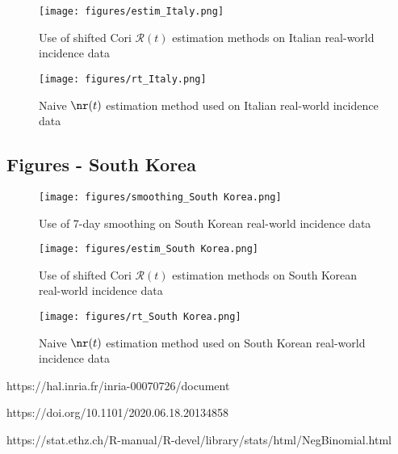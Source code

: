 \documentclass{article}
\newcommand{\nR}{\mathscr{R}}
\begin{document}
\begin{figure}[h!]
    \centering
    \texttt{[image: figures/estim\_Italy.png]}
    \caption{Use of shifted Cori $\nR(t)$ estimation methods on Italian real-world incidence data}
    \label{fig:my_label}
\end{figure}

\clearpage
\begin{figure}[h!]
    \centering
    \texttt{[image: figures/rt\_Italy.png]}
    \caption{Naive $\nr(t)$ estimation method used on Italian real-world incidence data}
    \label{fig:my_label}
\end{figure}


\subsection{Figures - South Korea}
\begin{figure}[h!]
    \centering
    \texttt{[image: figures/smoothing\_South Korea.png]}
    \caption{Use of 7-day smoothing on South Korean real-world incidence data}
    \label{fig:my_label}
\end{figure}

\begin{figure}[h!]
    \centering
    \texttt{[image: figures/estim\_South Korea.png]}
    \caption{Use of shifted Cori $\nR(t)$ estimation methods on South Korean real-world incidence data}
    \label{fig:my_label}
\end{figure}

\clearpage
\begin{figure}[h!]
    \centering
    \texttt{[image: figures/rt\_South Korea.png]}
    \caption{Naive $\nr(t)$ estimation method used on South Korean real-world incidence data}
    \label{fig:my_label}
\end{figure}



\begin{thebibliography}{1}
https://hal.inria.fr/inria-00070726/document
    
https://doi.org/10.1101/2020.06.18.20134858

https://stat.ethz.ch/R-manual/R-devel/library/stats/html/NegBinomial.html

\end{thebibliography}
\end{document}
